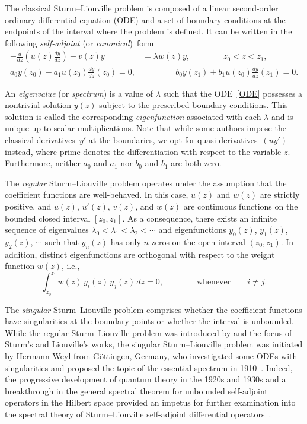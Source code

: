 \documentclass[symmetry,article,accept,moreauthors,pdftex,a4paper]{mdpi}
\begin{document}
The classical Sturm--Liouville problem is composed of a linear second-order ordinary differential equation (ODE) and a set of boundary conditions at the endpoints of the interval where the problem is defined. It can be written in the following \emph{self-adjoint} (or \mbox{\emph{canonical}) form}
\begin{align}
-\frac{d}{dz} \left(u(z) \frac{dy}{dz}\right) + v(z) y &= \lambda w(z) y, \qquad \qquad z_0 < z < z_1, 	\label{ODE}\\
a_0 y(z_0) - a_1 u(z_0) \frac{dy}{dz}(z_0) = 0,& \qquad \qquad b_0 y(z_1) + b_1 u(z_0) \frac{dy}{dz}(z_1) = 0.	\label{BC}
\end{align}

An \emph{eigenvalue} (or \emph{spectrum}) is a value of $\lambda$ such that the ODE~\eqref{ODE} possesses a nontrivial solution $y(z)$ subject to the prescribed boundary conditions. This solution is called the corresponding \emph{eigenfunction} associated with each $\lambda$ and is unique up to scalar multiplications. Note that while some authors impose the classical derivatives~$y'$ at the boundaries, we opt for quasi-derivatives~$(uy')$ instead, where prime denotes the differentiation with respect to the variable $z$. Furthermore, neither $a_0$ and $a_1$ nor $b_0$ and $b_1$ are both zero.

The \emph{regular} Sturm--Liouville problem operates under the assumption that the coefficient functions are well-behaved. In this case, $u(z)$ and $w(z)$ are strictly positive, and $u(z)$, $u'(z)$, $v(z)$, and $w(z)$ are continuous functions on the bounded closed interval $[z_0, z_1]$. As a consequence, there exists an infinite sequence of eigenvalues $\lambda_0 < \lambda_1 < \lambda_2 < \cdots$ and eigenfunctions $y_0(z)$, $y_1(z)$, $y_2(z)$, $\cdots$ such that $y_n(z)$ has only $n$ zeros on the open interval $(z_0, z_1)$. In addition, distinct eigenfunctions are orthogonal with respect to the weight function $w(z)$, i.e.,
\begin{equation*}
\int_{z_0}^{z_1} w(z) \, y_i(z) \, y_j(z) \, dz = 0, \qquad \qquad \text{whenever} \qquad i \neq j.
\end{equation*}

The \emph{singular} Sturm--Liouville problem comprises whether the coefficient functions have singularities at the boundary points or whether the interval is unbounded. While the regular Sturm--Liouville problem was introduced by and the focus of Sturm's and Liouville's works, the singular Sturm--Liouville problem was initiated by Hermann Weyl from G\"ottingen, Germany, who investigated some ODEs with singularities and proposed the topic of the essential spectrum in 1910~\cite{weyl1910ueber}. Indeed, the progressive development of quantum theory in the 1920s and 1930s and a breakthrough in the general spectral theorem for unbounded self-adjoint operators in the Hilbert space provided an impetus for further examination into the spectral theory of Sturm--Liouville self-adjoint differential operators~\cite{zettl2010sturm,titchmarsh1962eigenfunction}.
\end{document}
